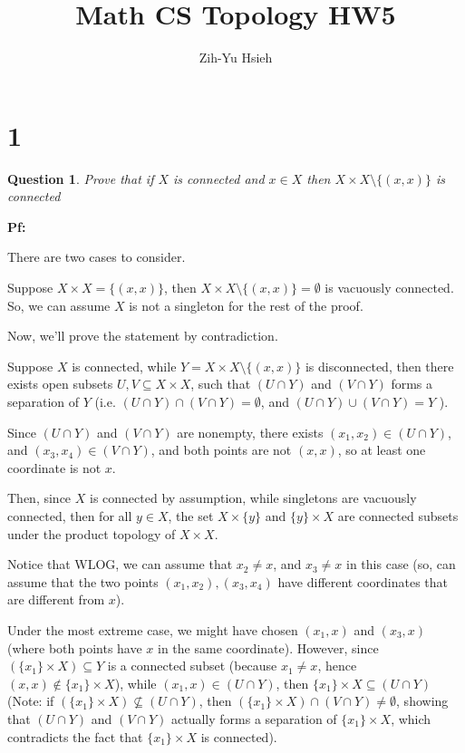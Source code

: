 \documentclass{article}
\title{Math CS Topology HW5}
\author{Zih-Yu Hsieh}
\newtheorem{question}{Question}
\begin{document}
\maketitle

\section*{1}
\begin{myBox}[]{}
    \begin{question}
        Prove that if $X$ is connected and $x\in X$ then $X\times X\setminus \{(x,x)\}$ is connected
    \end{question}
\end{myBox}

\textbf{Pf:}

There are two cases to consider.

Suppose $X\times X=\{(x,x)\}$, then $X\times X\setminus\{(x,x)\} = \emptyset$ is vacuously connected.
So, we can assume $X$ is not a singleton for the rest of the proof.

\hfil

Now, we'll prove the statement by contradiction. 

Suppose $X$ is connected, while $Y=X\times X\setminus\{(x,x)\}$ is disconnected,
then there exists open subsets $U,V\subseteq X\times X$, such that $(U\cap Y)$ and $(V\cap Y)$ forms a separation of $Y$ (i.e. $(U\cap Y)\cap (V\cap Y)=\emptyset$, and $(U\cap Y)\cup (V\cap Y)=Y$ ).

Since $(U\cap Y)$ and $(V\cap Y)$ are nonempty, there exists $(x_1,x_2)\in (U\cap Y)$, and $(x_3,x_4)\in (V\cap Y)$, and both points are not $(x,x)$, so at least one coordinate is not $x$.

Then, since $X$ is connected by assumption, while singletons are vacuously connected, then for all $y\in X$, the set $X\times \{y\}$ and $\{y\}\times X$ are connected subsets under the product topology of $X\times X$.

\hfil

Notice that WLOG, we can assume that $x_2\neq x$, and $x_3\neq x$ in this case (so, can assume that the two points $(x_1,x_2),(x_3,x_4)$ have different coordinates that are different from $x$).

Under the most extreme case, we might have chosen $(x_1,x)$ and $(x_3,x)$ (where both points have $x$ in the same coordinate). However, since $(\{x_1\}\times X)\subseteq Y$ is a connected subset (because $x_1\neq x$, hence $(x,x)\notin \{x_1\}\times X$), while $(x_1,x)\in (U\cap Y)$,
then $\{x_1\}\times X\subseteq (U\cap Y)$ (Note: if $(\{x_1\}\times X)\not\subseteq (U\cap Y)$, then $(\{x_1\}\times X)\cap (V\cap Y)\neq \emptyset$, showing that $(U\cap Y)$ and $(V\cap Y)$ actually forms a separation of $\{x_1\}\times X$,
which contradicts the fact that $\{x_1\}\times X$ is connected).
\end{document}
